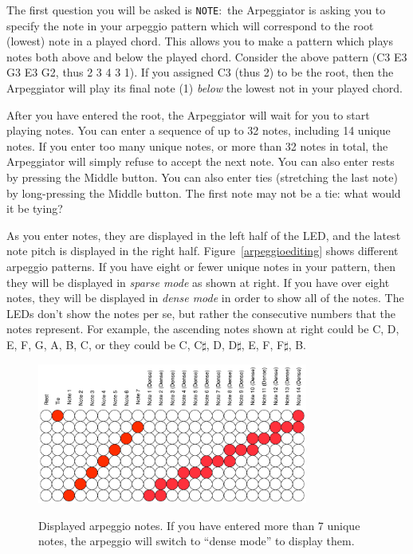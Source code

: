 \documentclass{article}
\begin{document}
The first question you will be asked is \texttt{NOTE}:\ the Arpeggiator is asking you to specify the note in your arpeggio pattern which will correspond to the root (lowest) note in a played chord.  This allows you to make a pattern which plays notes both above and below the played chord.  Consider the above pattern (C3 E3 G3 E3 G2, thus 2 3 4 3 1).  If you assigned C3 (thus 2) to be the root, then the Arpeggiator will play its final note (1) {\it below} the lowest not in your played chord.

After you have entered the root, the Arpeggiator will wait for you to start playing notes.  You can enter a sequence of up to 32 notes, including 14 unique notes.  If you enter too many unique notes, or more than 32 notes in total, the Arpeggiator will simply refuse to accept the next note.  You can also enter rests by pressing the Middle button.  You can also enter ties (stretching the last note) by long-pressing the Middle button.  The first note may not be a tie: what would it be tying?

As you enter notes, they are displayed in the left half of the LED, and the latest note pitch is displayed in the right half. Figure~\ref{arpeggioediting} shows different arpeggio patterns.  If you have eight or fewer unique notes in your pattern, then they will be displayed in {\it sparse mode} as shown at right.  If you have over eight notes, they will be displayed in {\it dense mode} in order to show all of the notes.  The LEDs don't show the notes per se, but rather the consecutive numbers that the notes represent.  For example, the ascending notes shown at right could be C, D, E, F, G, A, B, C, or they could be C, C\(\sharp\), D, D\(\sharp\), E, F, F\(\sharp\), B.

\begin{figure}
\begin{center}
\vspace{-2.5em}
\includegraphics[width=3.5in]{arpeggionotes.pdf}\\
\end{center}
\vspace{-1em}\caption{Displayed arpeggio notes.  If you have entered more than 7 unique notes, the arpeggio will switch to ``dense mode'' to display them.}
\vspace{-1em}
\label{arpeggionotes}
\end{figure}
\end{document}
